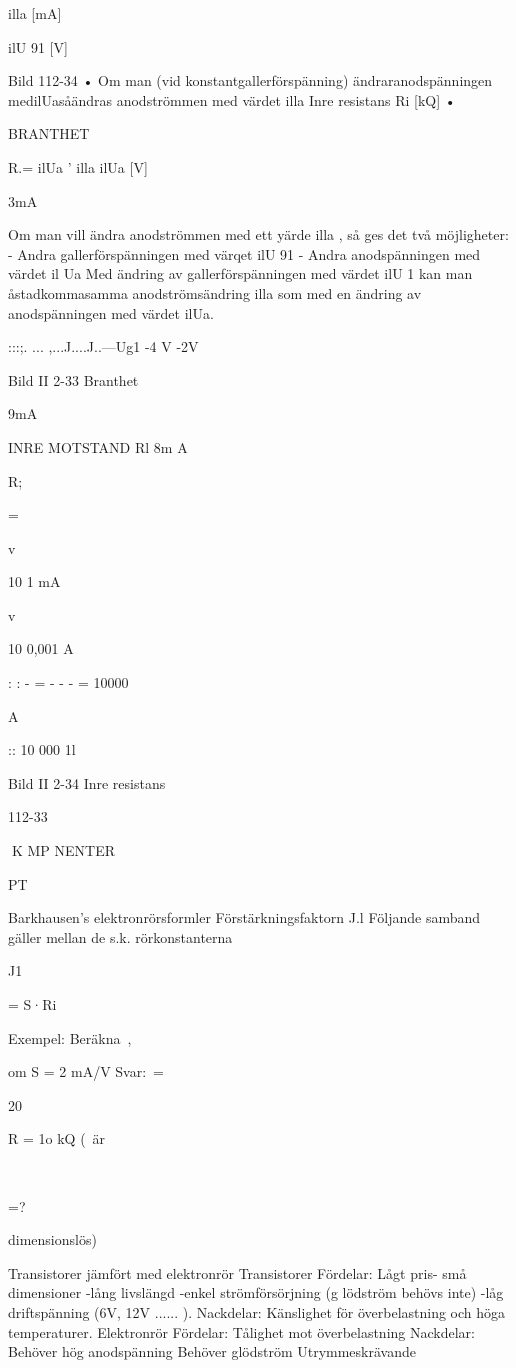 \documentclass[a4paper,twoside,twocolumn,openright]{book}
\begin{document}
{{{{illa [mA]

ilU 91 [V]

Bild 112-34
• Om man (vid konstantgallerförspänning)
ändraranodspänningen medilUasåändras anodströmmen med värdet illa
Inre resistans
Ri [kQ]
•

BRANTHET

R.= ilUa
' illa
ilUa [V]

3mA

Om man vill ändra anodströmmen med
ett yärde illa , så ges det två möjligheter:
- Andra gallerförspänningen med värqet ilU 91
- Andra anodspänningen med värdet
il Ua
Med ändring av gallerförspänningen
med värdet ilU 1 kan man åstadkommasamma anodströmsändring illa som
med en ändring av anodspänningen
med värdet ilUa.

:::;. ... ,...J....J..---Ug1
-4 V
-2V

Bild II 2-33 Branthet

9mA

INRE MOTSTAND Rl
8m A

R;

=

v

10
1 mA

v

10
0,001 A

: : - = - - - = 10000

A

:: 10 000 1l

Bild II 2-34 Inre resistans

112-33

K MP NENTER

PT

Barkhausen's elektronrörsformler
Förstärkningsfaktorn J.l
Följande samband gäller mellan de s.k. rörkonstanterna

J1

= S·Ri

Exempel:
Beräkna~,

om S = 2 mA/V
Svar:~=

20

R = 1o kQ
(~är

~

=?

dimensionslös)

Transistorer jämfört med elektronrör
Transistorer
Fördelar:
Lågt pris- små dimensioner -lång livslängd
-enkel strömförsörjning (g lödström behövs
inte) -låg driftspänning (6V, 12V ...... ).
Nackdelar:
Känslighet för överbelastning och höga
temperaturer.
Elektronrör
Fördelar:
Tålighet mot överbelastning
Nackdelar:
Behöver hög anodspänning
Behöver glödström
Utrymmeskrävande

}}}}
\end{document}
